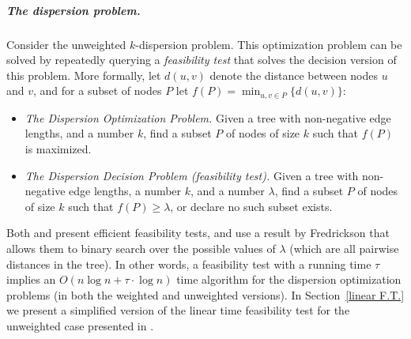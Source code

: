 \documentclass[a4paper,UKenglish]{lipics-v2016}
\theoremstyle{plain}
\newcommand{\Oh}{{O}}
\renewcommand{\paragraph}{\subparagraph}
\begin{document}
\paragraph{The dispersion problem.}
Consider the unweighted $k$-dispersion problem. This optimization problem can be solved by repeatedly querying a {\em feasibility test} that solves the decision version of this problem. More formally, let $d(u,v)$ denote the distance between nodes $u$ and $v$, and for a subset of nodes $P$ let $f(P)=\min_{u,v\in P} \{d(u,v)\}$:


\begin{itemize} 
\item {\em The Dispersion Optimization Problem.} Given a tree with non-negative edge lengths, and a  number $k$, find a subset $P$ of nodes of size $k$ such that $f(P)$ is maximized. 

\item  {\em The Dispersion Decision Problem (feasibility test).}  Given a tree with non-negative edge lengths, a number $k$, and a number $\lambda$, find a subset $P$ of nodes of size $k$ such that  $f(P)\geq\lambda$, or declare no such subset exists. 
\end{itemize}

Both \cite{Bhattacharya1991} and \cite{Bhattacharya1999} present efficient feasibility tests, and use a result by Fredrickson \cite{Frederickson1983} that allows them to binary search over the possible values of $\lambda$ (which are all pairwise distances in the tree). In other words, a feasibility test with a running time $\tau$  implies an $O(n \log n + \tau \cdot \log n)$ time algorithm for the dispersion optimization problems (in both the weighted and unweighted versions). In Section~\ref{linear F.T.} we present a simplified version of the linear time feasibility test for the unweighted case presented in \cite{Bhattacharya1991}.
 
\end{document}
